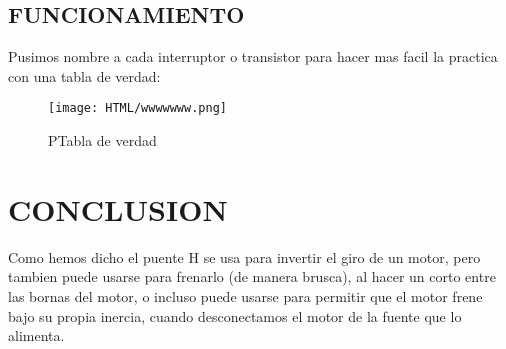 \documentclass[11pt,a4paper]{article}
\begin{document}
\newpage 

\subsection{FUNCIONAMIENTO}
Pusimos nombre a cada interruptor o transistor para hacer mas facil la practica con una tabla de verdad:\\

\begin{figure}[h]
\centering
\texttt{[image: HTML/wwwwwww.png]} 
\caption{PTabla de verdad}
\end{figure}

\section{CONCLUSION}
Como hemos dicho el puente H se usa para invertir el giro de un motor, pero tambien puede usarse para frenarlo (de manera brusca), al hacer un corto entre las bornas del motor, o incluso puede usarse para permitir que el motor frene bajo su propia inercia, cuando desconectamos el motor de la fuente que lo alimenta.
\end{document}
